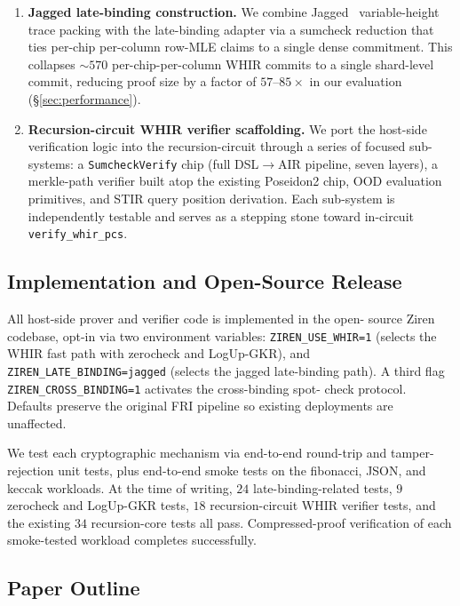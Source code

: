 \begin{enumerate}
  \item \textbf{Jagged late-binding construction.}  We combine
        Jagged~\cite{jagged} variable-height trace packing with the
        late-binding adapter via a sumcheck reduction that ties
        per-chip per-column row-MLE claims to a single dense
        commitment.  This collapses $\sim 570$ per-chip-per-column
        WHIR commits to a single shard-level commit, reducing
        proof size by a factor of $57$--$85\times$ in our
        evaluation (\S\ref{sec:performance}).

  \item \textbf{Recursion-circuit WHIR verifier scaffolding.}  We
        port the host-side verification logic into the
        recursion-circuit through a series of focused sub-systems:
        a \texttt{SumcheckVerify} chip (full DSL$\to$AIR pipeline,
        seven layers), a merkle-path verifier built atop the
        existing Poseidon2 chip, OOD evaluation primitives, and
        STIR query position derivation.  Each sub-system is
        independently testable and serves as a stepping stone
        toward in-circuit \texttt{verify\_whir\_pcs}.
\end{enumerate}

\subsection{Implementation and Open-Source Release}

All host-side prover and verifier code is implemented in the open-
source Ziren codebase, opt-in via two environment variables:
\texttt{ZIREN\_USE\_WHIR=1} (selects the WHIR fast path with
zerocheck and LogUp-GKR), and \texttt{ZIREN\_LATE\_BINDING=jagged}
(selects the jagged late-binding path).  A third flag
\texttt{ZIREN\_CROSS\_BINDING=1} activates the cross-binding spot-
check protocol.  Defaults preserve the original FRI pipeline so
existing deployments are unaffected.

We test each cryptographic mechanism via end-to-end round-trip and
tamper-rejection unit tests, plus end-to-end smoke tests on the
fibonacci, JSON, and keccak workloads.  At the time of writing,
$24$ late-binding-related tests, $9$ zerocheck and LogUp-GKR tests,
$18$ recursion-circuit WHIR verifier tests, and the existing $34$
recursion-core tests all pass.  Compressed-proof verification of
each smoke-tested workload completes successfully.

\subsection{Paper Outline}

